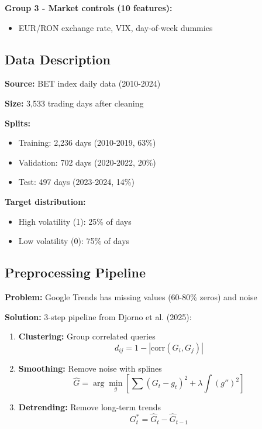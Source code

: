 \documentclass[12pt,a4paper]{article}
\begin{document}
\textbf{Group 3 - Market controls (10 features):}
\begin{itemize}
    \item EUR/RON exchange rate, VIX, day-of-week dummies
\end{itemize}

\subsection{Data Description}

\textbf{Source:} BET index daily data (2010-2024)

\textbf{Size:} 3,533 trading days after cleaning

\textbf{Splits:}
\begin{itemize}
    \item Training: 2,236 days (2010-2019, 63\%)
    \item Validation: 702 days (2020-2022, 20\%)
    \item Test: 497 days (2023-2024, 14\%)
\end{itemize}

\textbf{Target distribution:}
\begin{itemize}
    \item High volatility (1): 25\% of days
    \item Low volatility (0): 75\% of days
\end{itemize}

\subsection{Preprocessing Pipeline}

\textbf{Problem:} Google Trends has missing values (60-80\% zeros) and noise

\textbf{Solution:} 3-step pipeline from Djorno et al. (2025):

\begin{enumerate}
    \item \textbf{Clustering:} Group correlated queries
    \begin{equation}
    d_{ij} = 1 - |\text{corr}(G_i, G_j)|
    \end{equation}
    
    \item \textbf{Smoothing:} Remove noise with splines
    \begin{equation}
    \hat{G} = \arg\min_g \left[\sum (G_t - g_t)^2 + \lambda \int (g'')^2 \right]
    \end{equation}
    
    \item \textbf{Detrending:} Remove long-term trends
    \begin{equation}
    G_t^* = \hat{G}_t - \hat{G}_{t-1}
    \end{equation}
\end{enumerate}
\end{document}
